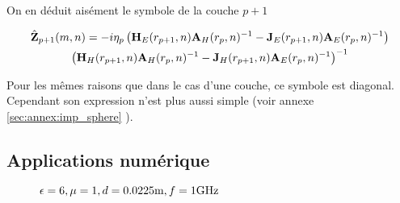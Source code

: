         On en déduit aisément le symbole de la couche \(p+1\)

        \begin{multline}
            \hat{\mathbf{Z}}_{p+1}(m,n) = -i\eta_p
            \left(
                \mathbf{H}_{E}(r_{p+1},n)
                \mathbf{A}_{H}(r_p,n)^{-1}
                -
                \mathbf{J}_{E}(r_{p+1},n)
                \mathbf{A}_{E}(r_p,n)^{-1}
            \right)
            \\
            \left(
                \mathbf{H}_{H}(r_{p+1},n)
                \mathbf{A}_{H}(r_p,n)^{-1}
                -
                \mathbf{J}_{H}(r_{p+1},n)
                \mathbf{A}_{E}(r_p,n)^{-1}
            \right)^{-1}
        \end{multline}

        Pour les mêmes raisons que dans le cas d'une couche, ce symbole est diagonal. Cependant son expression n'est plus aussi simple (voir annexe \ref{sec:annex:imp_sphere} ).

  \subsection{Applications numérique}

    \begin{figure}[!hbt]
      \centering
      \caption{\(\epsilon = 6, \mu = 1, d=0.0225\text{m}, f=1\text{GHz}\)}
      \label{fig:imp_fourier:sphere:hoppe_p62:converge_rayon:error}
    \end{figure}
